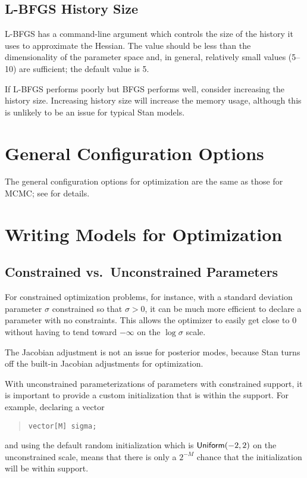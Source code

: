 \subsection{L-BFGS History Size}

L-BFGS has a command-line argument which controls the size of the
history it uses to approximate the Hessian. The value should be less than
the dimensionality of the parameter space and, in general, relatively
small values (5--10) are sufficient; the default value is 5.

If L-BFGS performs poorly but BFGS performs well, consider increasing
the history size. Increasing history size will increase the
memory usage, although this is unlikely to be an issue for typical
Stan models.


\section{General Configuration Options}

The general configuration options for optimization are the same as
those for MCMC;  see  for details.


\section{Writing Models for Optimization}

\subsection{Constrained vs.\ Unconstrained Parameters}

For constrained optimization problems, for instance, with a standard
deviation parameter $\sigma$ constrained so that $\sigma > 0$, it can
be much more efficient to declare a parameter  with no
constraints.  This allows the optimizer to easily get close to 0
without having to tend toward $-\infty$ on the $\log \sigma$ scale.

The Jacobian adjustment is not an issue for posterior modes, because
Stan turns off the built-in Jacobian adjustments for optimization.

With unconstrained parameterizations of parameters with constrained
support, it is important to provide a custom initialization that is
within the support.  For example, declaring a vector
%
\begin{quote}
\begin{Verbatim}
vector[M] sigma;
\end{Verbatim}
\end{quote}
%
and using the default random initialization which is
$\distro{Uniform}(-2,2)$ on the unconstrained scale, means that there
is only a $2^{-M}$ chance that the initialization will be within
support.

